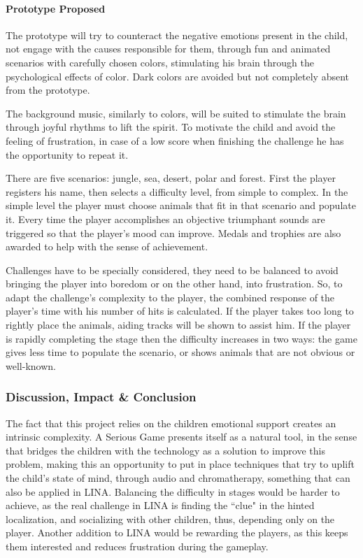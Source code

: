 \documentclass[runningheads]{llncs}
\begin{document}
\paragraph{Prototype Proposed} The prototype will try to counteract the negative emotions present in the child, not engage with the causes responsible for them, through fun and animated scenarios with carefully chosen colors, stimulating his brain through the psychological effects of color. Dark colors are avoided but not completely absent from the prototype.
\par The background music, similarly to colors, will be suited to stimulate the brain through joyful rhythms to lift the spirit. To motivate the child and avoid the feeling of frustration, in case of a low score when finishing the challenge he has the opportunity to repeat it. 
\par There are five scenarios: jungle, sea, desert, polar and forest. First the player registers his name, then selects a difficulty level, from simple to complex. In the simple level the player must choose animals that fit in that scenario and populate it. Every time the player accomplishes an objective triumphant sounds are triggered so that the player's mood can improve. Medals and trophies are also awarded to help with the sense of achievement.
\par Challenges have to be specially considered, they need to be balanced to avoid bringing the player into boredom or on the other hand, into frustration. So, to adapt the challenge's complexity to the player, the combined response of the player's time with his number of hits is calculated. If the player takes too long to rightly place the animals, aiding tracks will be shown to assist him. If the player is rapidly completing the stage then the difficulty increases in two ways: the game gives less time to populate the scenario, or shows animals that are not obvious or well-known.


\subsubsection{Discussion, Impact \& Conclusion}
\par The fact that this project relies on the children emotional support creates an intrinsic complexity. A Serious Game presents itself as a natural tool, in the sense that bridges the children with the technology as a solution to improve this problem, making this an opportunity to put in place techniques that try to uplift the child's state of mind, through audio and chromatherapy, something that can also be applied in LINA. Balancing the difficulty in stages would be harder to achieve, as the real challenge in LINA is finding the ``clue" in the hinted localization, and socializing with other children, thus, depending only on the player. Another addition to LINA would be rewarding the players, as this keeps them interested and reduces frustration during the gameplay.
\end{document}
